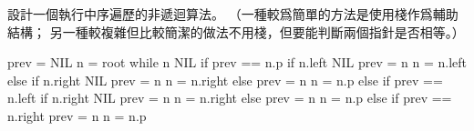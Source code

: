 \startEXERCISE
設計一個執行中序遍歷的非遞迴算法。
（\hint 一種較爲簡單的方法是使用棧作爲輔助結構；
另一種較複雜但比較簡潔的做法不用棧，但要能判斷兩個指針是否相等。）
\stopEXERCISE

\startANSWER
{}
\startCLRSCODE
prev = NIL
n = root
while n \ne NIL
	if prev == n.p
		if n.left \ne NIL
			prev = n
			n = n.left
		else
			if n.right \ne NIL
				prev = n
				n = n.right
			else
				prev = n
				n = n.p
	else if prev == n.left
		if n.right \ne NIL
			prev = n
			n = n.right
		else
			prev = n
			n = n.p
	else if prev == n.right
		prev = n
		n = n.p
\stopCLRSCODE
\stopANSWER
